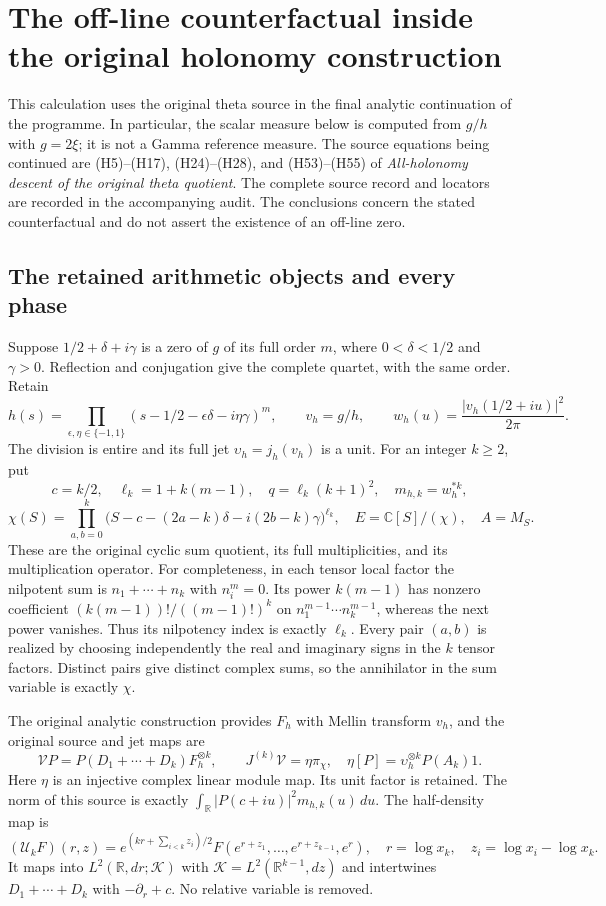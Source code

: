 \section{The off-line counterfactual inside the original holonomy construction}

This calculation uses the original theta source in the final analytic
continuation of the programme.  In particular, the scalar measure below is
computed from $g/h$ with $g=2\xi$; it is not a Gamma reference measure.
The source equations being continued are (H5)--(H17), (H24)--(H28), and
(H53)--(H55) of \emph{All-holonomy descent of the original theta quotient}.
The complete source record and locators are recorded in the accompanying
audit.  The conclusions concern the stated counterfactual and do not assert
the existence of an off-line zero.

\subsection{The retained arithmetic objects and every phase}

Suppose $1/2+\delta+i\gamma$ is a zero of $g$ of its full order $m$, where
$0<\delta<1/2$ and $\gamma>0$.  Reflection and conjugation give the complete
quartet, with the same order.  Retain
\[
 h(s)=\prod_{\epsilon,\eta\in\{-1,1\}}
 (s-1/2-\epsilon\delta-i\eta\gamma)^m,
 \qquad v_h=g/h,
 \qquad w_h(u)=\frac{|v_h(1/2+iu)|^2}{2\pi}.
 \tag{HT1}
\]
The division is entire and its full jet $\upsilon_h=j_h(v_h)$ is a unit.
For an integer $k\geq2$, put
\[
 c=k/2,\quad \ell_k=1+k(m-1),\quad q=\ell_k(k+1)^2,
 \quad m_{h,k}=w_h^{*k},
\]
\[
 \chi(S)=\prod_{a,b=0}^{k}
 \bigl(S-c-(2a-k)\delta-i(2b-k)\gamma\bigr)^{\ell_k},
 \quad E=\mathbb{C}[S]/(\chi),\quad A=M_S.
 \tag{HT2}
\]
These are the original cyclic sum quotient, its full multiplicities, and
its multiplication operator.  For completeness, in each tensor local
factor the nilpotent sum is $n_1+\cdots+n_k$ with $n_i^m=0$.
Its power $k(m-1)$ has nonzero coefficient
$(k(m-1))!/((m-1)!)^k$ on $n_1^{m-1}\cdots n_k^{m-1}$, whereas the next
power vanishes.  Thus its nilpotency index is exactly $\ell_k$.
Every pair $(a,b)$ is realized by choosing independently the real and
imaginary signs in the $k$ tensor factors.  Distinct pairs give distinct
complex sums, so the annihilator in the sum variable is exactly $\chi$.

The original analytic construction provides $F_h$ with Mellin transform
$v_h$, and the original source and jet maps are
\[
 \mathcal VP=P(D_1+\cdots+D_k)F_h^{\otimes k},\qquad
 J^{(k)}\mathcal V=\eta\pi_\chi,
 \quad \eta[P]=\upsilon_h^{\otimes k}P(A_k)1.
 \tag{HT3}
\]
Here $\eta$ is an injective complex linear module map.  Its unit factor is
retained.  The norm of this source is exactly
$\int_{\mathbb{R}}|P(c+iu)|^2m_{h,k}(u)\,du$.
The half-density map is
\[
 (\mathcal U_k F)(r,z)=e^{(kr+\sum_{i<k}z_i)/2}
 F(e^{r+z_1},\ldots,e^{r+z_{k-1}},e^r),
 \quad r=\log x_k,\quad z_i=\log x_i-\log x_k.
 \tag{HT4}
\]
It maps into $L^2(\mathbb{R},dr;\mathcal K)$ with
$\mathcal K=L^2(\mathbb{R}^{k-1},dz)$ and intertwines $D_1+\cdots+D_k$
with $-\partial_r+c$.  No relative variable is removed.

